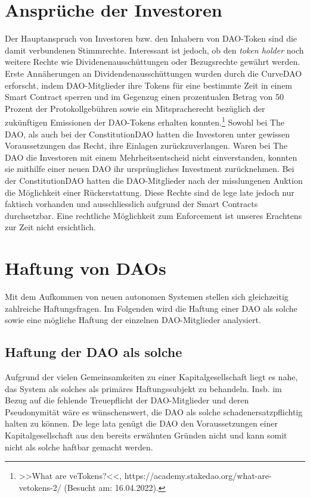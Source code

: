 \documentclass[a4paper,12pt]{report}
\begin{document}
	\section{Ansprüche der Investoren}
	\startsection
	Der Hauptanspruch von Investoren bzw. den Inhabern von DAO-Token sind die damit verbundenen Stimmrechte. Interessant ist jedoch, ob den \textit{token holder} noch weitere Rechte wie Dividenenausschüttungen oder Bezugsrechte gewährt werden. Erste Annäherungen an Dividendenausschüttungen wurden durch die CurveDAO erforscht, indem DAO-Mitglieder ihre Tokens für eine bestimmte Zeit in einem Smart Contract sperren und im Gegenzug einen prozentualen Betrag von 50 Prozent der Protokollgebühren sowie ein Mitspracherecht bezüglich der zukünftigen Emissionen der DAO-Tokens erhalten konnten.\footnote{\hspace{0.5em}\begin{minipage}[t]{13cm}>>What are veTokens?<<, https://academy.stakedao.org/what-are-vetokens-2/ (Besucht am: 16.04.2022).\end{minipage}} Sowohl bei The DAO, als auch bei der ConstitutionDAO hatten die Investoren unter gewissen Voraussetzungen das Recht, ihre Einlagen zurückzuverlangen. Waren bei The DAO die Investoren mit einem Mehrheitsentscheid nicht einverstanden, konnten sie mithilfe einer neuen DAO ihr ursprüngliches Investment zurücknehmen. Bei der ConstitutionDAO hatten die DAO-Mitglieder nach der misslungenen Auktion die Möglichkeit einer Rückerstattung. Diese Rechte sind de lege late jedoch nur faktisch vorhanden und ausschliesslich aufgrund der Smart Contracts durchsetzbar. Eine rechtliche Möglichkeit zum Enforcement ist unseres Erachtens zur Zeit nicht ersichtlich.
	\closesection
	
	\section{Haftung von DAOs}
	\startsection
	Mit dem Aufkommen von neuen autonomen Systemen stellen sich gleichzeitig zahlreiche Haftungsfragen. Im Folgenden wird die Haftung einer DAO als solche sowie eine mögliche Haftung der einzelnen DAO-Mitglieder analysiert.
	
	\subsection{Haftung der DAO als solche}
	\startsubsection
    Aufgrund der vielen Gemeinsamkeiten zu einer Kapitalgesellschaft liegt es nahe, das System als solches als primäres Haftungssubjekt zu behandeln. Insb. im Bezug auf die fehlende Treuepflicht der DAO-Mitglieder und deren Pseudonymität wäre es wünschenswert, die DAO als solche schadenersatzpflichtig halten zu können. De lege lata genügt die DAO den Voraussetzungen einer Kapitalgesellschaft aus den bereits erwähnten Gründen nicht und kann somit nicht als solche haftbar gemacht werden. 
	\closesection
\end{document}
